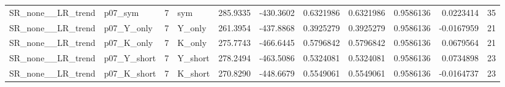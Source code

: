 \begin{table}[!h]
\begin{tabular}[t]{llrlrrrrrrr}
\addlinespace
SR\_none\_\_LR\_trend & p07\_sym & 7 & sym & 285.9335 & -430.3602 & 0.6321986 & 0.6321986 & 0.9586136 & 0.0223414 & 35\\
SR\_none\_\_LR\_trend & p07\_Y\_only & 7 & Y\_only & 261.3954 & -437.8868 & 0.3925279 & 0.3925279 & 0.9586136 & -0.0167959 & 21\\
SR\_none\_\_LR\_trend & p07\_K\_only & 7 & K\_only & 275.7743 & -466.6445 & 0.5796842 & 0.5796842 & 0.9586136 & 0.0679564 & 21\\
SR\_none\_\_LR\_trend & p07\_Y\_short & 7 & Y\_short & 278.2494 & -463.5086 & 0.5324081 & 0.5324081 & 0.9586136 & 0.0734898 & 23\\
SR\_none\_\_LR\_trend & p07\_K\_short & 7 & K\_short & 270.8290 & -448.6679 & 0.5549061 & 0.5549061 & 0.9586136 & -0.0164737 & 23\\
\bottomrule
\end{tabular}
\end{table}
